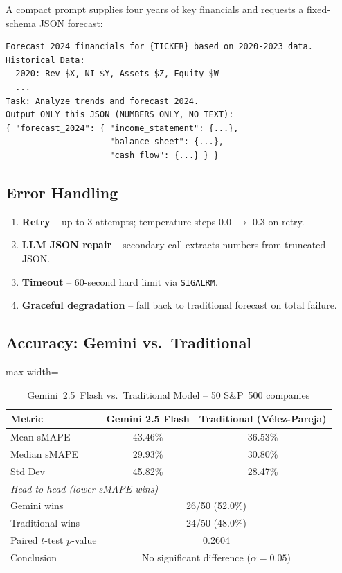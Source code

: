 \documentclass[11pt,a4paper]{article}
\begin{document}
A compact prompt supplies four years of key financials and requests a
fixed-schema JSON forecast:

\begin{lstlisting}[caption={Forecast prompt (condensed)}]
Forecast 2024 financials for {TICKER} based on 2020-2023 data.
Historical Data:
  2020: Rev $X, NI $Y, Assets $Z, Equity $W
  ...
Task: Analyze trends and forecast 2024.
Output ONLY this JSON (NUMBERS ONLY, NO TEXT):
{ "forecast_2024": { "income_statement": {...},
                     "balance_sheet": {...},
                     "cash_flow": {...} } }
\end{lstlisting}

\subsection{Error Handling}

\begin{enumerate}
  \item \textbf{Retry} -- up to 3 attempts; temperature steps 0.0 $\to$ 0.3 on retry.
  \item \textbf{LLM JSON repair} -- secondary call extracts numbers from truncated JSON.
  \item \textbf{Timeout} -- 60-second hard limit via \texttt{SIGALRM}.
  \item \textbf{Graceful degradation} -- fall back to traditional forecast on total failure.
\end{enumerate}

\subsection{Accuracy: Gemini vs.\ Traditional}

\begin{table}[H]\centering
\caption{Gemini~2.5~Flash vs.\ Traditional Model -- 50 S\&P~500 companies}
\label{tab:model_comparison}
\begin{adjustbox}{max width=\textwidth}
\begin{tabular}{lcc}\toprule
\textbf{Metric} & \textbf{Gemini 2.5 Flash} & \textbf{Traditional (V\'elez-Pareja)}\\\midrule
Mean sMAPE   & 43.46\% & 36.53\%\\
Median sMAPE & 29.93\% & 30.80\%\\
Std Dev      & 45.82\% & 28.47\%\\\midrule
\multicolumn{3}{l}{\textit{Head-to-head (lower sMAPE wins)}}\\
Gemini wins      & \multicolumn{2}{c}{26/50 \quad(52.0\%)}\\
Traditional wins & \multicolumn{2}{c}{24/50 \quad(48.0\%)}\\\midrule
Paired $t$-test $p$-value & \multicolumn{2}{c}{0.2604}\\
Conclusion & \multicolumn{2}{c}{No significant difference ($\alpha=0.05$)}\\
\bottomrule
\end{tabular}
\end{adjustbox}
\end{table}
\end{document}
